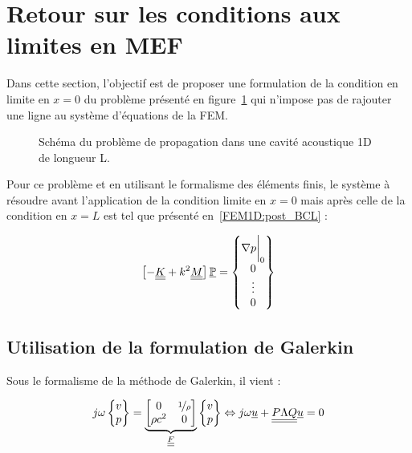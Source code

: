 \section{Retour sur les conditions aux limites en MEF}

Dans cette section, l'objectif est de proposer une formulation de la condition en limite en $x=0$ du problème présenté
en figure~\ref{fig:rflx:propa_1D} qui n'impose pas de rajouter une ligne au système d'équations de la FEM.

\begin{figure}[!ht]
	\centering
	
	\caption{\label{fig:rflx:propa_1D}Schéma du problème de propagation dans une cavité acoustique 1D de longueur L.}
\end{figure}

Pour ce problème et en utilisant le formalisme des éléments finis, le système à résoudre avant l'application de la
condition limite en $x=0$ mais après celle de la condition en $x=L$ est tel que présenté en~\eqref{FEM1D:post_BCL} :

\begin{equation}
\left[- \underline{\underline{K}} + k^2\underline{\underline{M}}\right]\underline{\mathbb{P}} = \begin{Bmatrix} \nabla p\bigg|_0\\0\\\vdots\\0\end{Bmatrix} \label{rflx:FEM}
\end{equation}


\subsection{Utilisation de la formulation de Galerkin}

Sous le formalisme de la méthode de Galerkin, il vient :

\begin{equation}
	j\omega\begin{Bmatrix}v\\p\end{Bmatrix} = 
		\underbrace{\begin{bmatrix}0 & \nicefrac{1}{\rho}\\\rho c^2 & 0\end{bmatrix}}_{\underline{\underline{F}}}
		\begin{Bmatrix}v\\p\end{Bmatrix} \Leftrightarrow j\omega\underline{u} + \underline{\underline{P\Lambda Q}}\underline{u} = 0
		\label{rflx:begin_dgm}
\end{equation}

